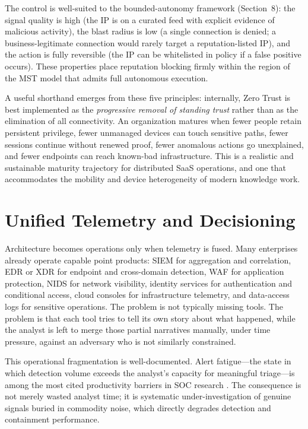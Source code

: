 \documentclass[unnumsec,webpdf,contemporary,large]{oup-authoring-template}
\theoremstyle{thmstyleone}
\theoremstyle{thmstyletwo}
\theoremstyle{thmstylethree}
\begin{document}
The control is well-suited to the bounded-autonomy framework (Section~8): the
signal quality is high (the IP is on a curated feed with explicit evidence of
malicious activity), the blast radius is low (a single connection is denied; a
business-legitimate connection would rarely target a reputation-listed IP), and
the action is fully reversible (the IP can be whitelisted in policy if a false
positive occurs). These properties place reputation blocking firmly within the
region of the MST model that admits full autonomous execution.

A useful shorthand emerges from these five principles: internally, Zero Trust is best
implemented as the \textit{progressive removal of standing trust} rather than as the
elimination of all connectivity. An organization matures when fewer people retain
persistent privilege, fewer unmanaged devices can touch sensitive paths, fewer sessions
continue without renewed proof, fewer anomalous actions go unexplained, and fewer
endpoints can reach known-bad infrastructure. This is a realistic and sustainable
maturity trajectory for distributed SaaS operations, and one that accommodates the
mobility and device heterogeneity of modern knowledge work.

\section{Unified Telemetry and Decisioning}

Architecture becomes operations only when telemetry is fused. Many enterprises already
operate capable point products: SIEM for aggregation and correlation, EDR or XDR for
endpoint and cross-domain detection, WAF for application protection, NIDS for network
visibility, identity services for authentication and conditional access, cloud consoles
for infrastructure telemetry, and data-access logs for sensitive operations. The problem
is not typically missing tools. The problem is that each tool tries to tell its own story
about what happened, while the analyst is left to merge those partial narratives manually,
under time pressure, against an adversary who is not similarly constrained.

This operational fragmentation is well-documented. Alert fatigue---the state in which
detection volume exceeds the analyst's capacity for meaningful triage---is among the
most cited productivity barriers in SOC research \cite{verizon2025}. The consequence is
not merely wasted analyst time; it is systematic under-investigation of genuine signals
buried in commodity noise, which directly degrades detection and containment performance.
\end{document}
